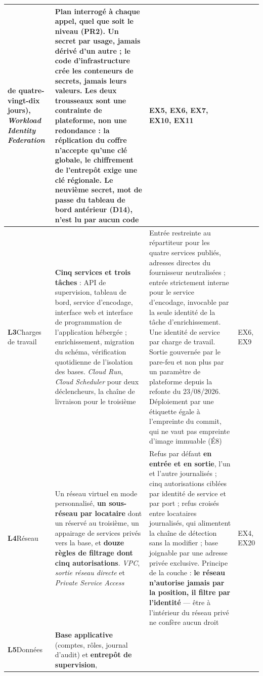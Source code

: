 \begin{longtable}{|P{1.70cm}|P{4.5cm}|P{7.18cm}|P{1.6cm}|}
de quatre-vingt-dix jours), \emph{Workload Identity Federation} &
Plan interrogé à chaque appel, quel que soit le niveau (PR2). Un secret par usage, jamais dérivé
d'un autre ; le code d'infrastructure crée les conteneurs de secrets, jamais leurs valeurs. Les deux
trousseaux sont une contrainte de plateforme, non une redondance : la réplication du coffre n'accepte
qu'une clé globale, le chiffrement de l'entrepôt exige une clé régionale. Le neuvième secret, mot de
passe du tableau de bord antérieur (D14), n'est lu par aucun code &
EX5, EX6, EX7, EX10, EX11 \\ \hline
\textbf{L3}\newline Charges de travail &
\textbf{Cinq services et trois tâches} : API de supervision, tableau de bord, service d'encodage,
interface web et interface de programmation de l'application hébergée ; enrichissement, migration
du schéma, vérification quotidienne de l'isolation des bases. \emph{Cloud Run}, \emph{Cloud
Scheduler} pour deux déclencheurs, la chaîne de livraison pour le troisième &
Entrée restreinte au répartiteur pour les quatre services publiés, adresses directes du fournisseur
neutralisées ; entrée strictement interne pour le service d'encodage, invocable par la seule
identité de la tâche d'enrichissement. Une identité de service par charge de travail. Sortie
gouvernée par le pare-feu et non plus par un paramètre de plateforme depuis la refonte du
23/08/2026. Déploiement par une étiquette égale à l'empreinte du commit, qui ne vaut pas empreinte
d'image immuable (É8) &
EX6, EX9 \\ \hline
\textbf{L4}\newline Réseau &
Un réseau virtuel en mode personnalisé, \textbf{un sous-réseau par locataire} dont un réservé au
troisième, un appairage de services privés vers la base, et \textbf{douze règles de filtrage dont
cinq autorisations}. \emph{VPC}, \emph{sortie réseau directe} et \emph{Private Service Access} &
Refus par défaut \textbf{en entrée et en sortie}, l'un et l'autre journalisés ; cinq autorisations
ciblées par identité de service et par port ; refus croisés entre locataires journalisés, qui
alimentent la chaîne de détection sans la modifier ; base joignable par une adresse privée
exclusive. Principe de la couche : \textbf{le réseau n'autorise jamais par la position, il filtre
par l'identité} --- être à l'intérieur du réseau privé ne confère aucun droit &
EX4, EX20 \\ \hline
\textbf{L5}\newline Données &
\textbf{Base applicative} (comptes, rôles, journal d'audit) et \textbf{entrepôt de supervision},

\end{longtable}
